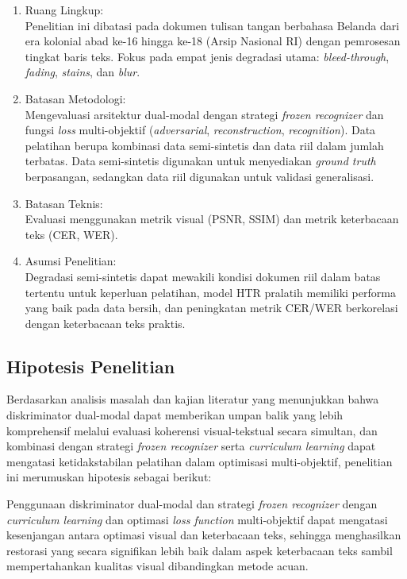 \documentclass[12pt,a4paper]{article}
\begin{document}
\begin{enumerate}[leftmargin=1.5em, labelsep=0.5em, itemindent=0pt, noitemsep, topsep=0pt]
      \item Ruang Lingkup: \\
            Penelitian ini dibatasi pada dokumen tulisan tangan berbahasa Belanda dari era kolonial abad ke-16 hingga ke-18 (Arsip Nasional RI) dengan pemrosesan tingkat baris teks. Fokus pada empat jenis degradasi utama: \textit{bleed-through}, \textit{fading}, \textit{stains}, dan \textit{blur}.
      \item Batasan Metodologi: \\
            Mengevaluasi arsitektur dual-modal dengan strategi \textit{frozen recognizer} dan fungsi \textit{loss} multi-objektif (\textit{adversarial}, \textit{reconstruction}, \textit{recognition}). Data pelatihan berupa kombinasi data semi-sintetis dan data riil dalam jumlah terbatas. Data semi-sintetis digunakan untuk menyediakan \textit{ground truth} berpasangan, sedangkan data riil digunakan untuk validasi generalisasi.
      \item Batasan Teknis: \\
            Evaluasi menggunakan metrik visual (PSNR, SSIM) dan metrik keterbacaan teks (CER, WER).
      \item Asumsi Penelitian: \\
            Degradasi semi-sintetis dapat mewakili kondisi dokumen riil dalam batas tertentu untuk keperluan pelatihan, model HTR pralatih memiliki performa yang baik pada data bersih, dan peningkatan metrik CER/WER berkorelasi dengan keterbacaan teks praktis.
\end{enumerate}

\subsection{Hipotesis Penelitian}
\label{subsec:hipotesis}

Berdasarkan analisis masalah dan kajian literatur yang menunjukkan bahwa diskriminator dual-modal dapat memberikan umpan balik yang lebih komprehensif melalui evaluasi koherensi visual-tekstual secara simultan, dan kombinasi dengan strategi \textit{frozen recognizer} serta \textit{curriculum learning} dapat mengatasi ketidakstabilan pelatihan dalam optimisasi multi-objektif, penelitian ini merumuskan hipotesis sebagai berikut:


Penggunaan diskriminator dual-modal dan strategi \textit{frozen recognizer} dengan \textit{curriculum learning} dan optimasi \textit{loss function} multi-objektif dapat mengatasi kesenjangan antara optimasi visual dan keterbacaan teks, sehingga menghasilkan restorasi yang secara signifikan lebih baik dalam aspek keterbacaan teks sambil mempertahankan kualitas visual dibandingkan metode acuan.
\end{document}
